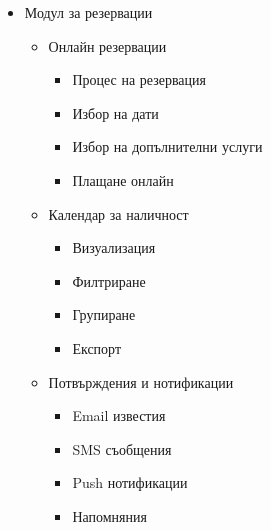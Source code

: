 \documentclass[12pt,a4paper]{article}
\begin{document}
\begin{itemize}
    \item Модул за резервации
    \begin{itemize}
        \item Онлайн резервации
        \begin{itemize}
            \item Процес на резервация
            \item Избор на дати
            \item Избор на допълнителни услуги
            \item Плащане онлайн
        \end{itemize}
        \item Календар за наличност
        \begin{itemize}
            \item Визуализация
            \item Филтриране
            \item Групиране
            \item Експорт
        \end{itemize}
        \item Потвърждения и нотификации
        \begin{itemize}
            \item Email известия
            \item SMS съобщения
            \item Push нотификации
            \item Напомняния
        \end{itemize}
    \end{itemize}
    

\end{itemize}
\end{document}
